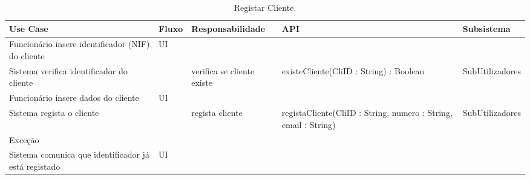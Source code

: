 \documentclass[../relatorio.tex]{subfiles}
\begin{document}
\begin{landscape}
    \begin{table}[!h]
        \centering
        \begin{tabular}{|p{5cm}|p{1cm}|p{4cm}|p{6cm}|p{3cm}|}
            \hline
            \rowcolor{gray!20!white}
            Use Case & Fluxo                                            & Responsabilidade & API & Subsistema \\
            \hline
            \rowcolor{yellow}
            Funcionário insere identificador (NIF) do cliente
                     & UI
                     & 
                     & 
                     & 
            \\
            \hline
            Sistema verifica identificador do cliente
                     & 
                     & verifica se cliente existe
                     & existeCliente(CliID : String) : Boolean
                     & SubUtilizadores
            \\
            \hline
            \rowcolor{yellow}
            Funcionário insere dados do cliente
                     & UI
                     & 
                     & 
                     & 
            \\
            \hline
            Sistema regista o cliente
                     & 
                     & regista cliente
                     & registaCliente(CliID : String, numero : String, email : String)
                     & SubUtilizadores
            \\
            \hline
            \rowcolor{red!30}
            Exceção  &                                                  &                  &     &            \\
            \hline
            Sistema comunica que identificador já está registado
                     & UI
                     & 
                     & 
                     & 
            \\
            \hline
        \end{tabular}
        \caption{Registar Cliente.}
    \end{table}
\end{landscape}
\end{document}
